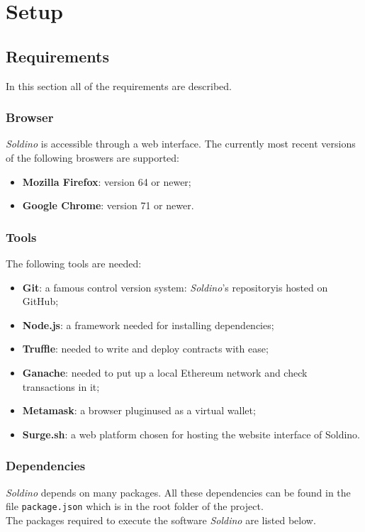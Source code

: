 \section{Setup} 
\subsection{Requirements}
In this section all of the requirements are described.
\subsubsection{Browser}
\textit{Soldino} is accessible through a web interface. The currently most 
recent versions of the following broswers are supported:
\begin{itemize}
	\item \textbf{Mozilla Firefox}: version 64 or newer;
	\item \textbf{Google Chrome}: version 71 or newer.
\end{itemize}

\subsubsection{Tools}
The following tools are needed:
\begin{itemize}
	\item \textbf{Git}: a famous control version system: \textit{Soldino}'s 
	repository\glosp is hosted on GitHub\glo;
	\item \textbf{Node.js\glo}: a framework needed for installing dependencies;
	\item \textbf{Truffle\glo}: needed to write and deploy contracts with ease;
	\item \textbf{Ganache\glo}: needed to put up a local Ethereum network and check 
	transactions in it;
	\item \textbf{Metamask\glo}: a browser plugin\glosp used as a virtual wallet;
	\item \textbf{Surge.sh\glo}: a web platform chosen for hosting the website 
	interface of Soldino.
\end{itemize}

\subsubsection{Dependencies}
\textit{Soldino} depends on many packages. All these dependencies can be found 
in the file \texttt{package.json} which is in the root folder of the project.\\
The packages required to execute the software \textit{Soldino} are listed below.\\

